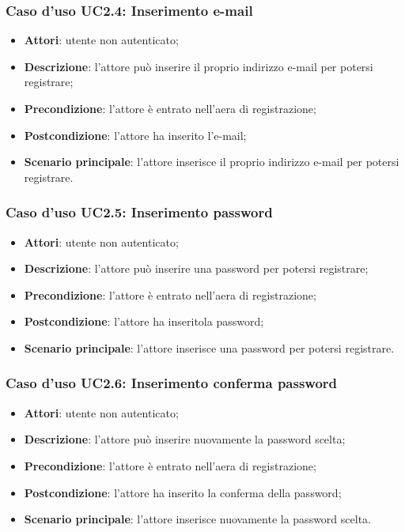 \subsubsection{Caso d'uso UC2.4: Inserimento e-mail}
\begin{itemize}
\item \textbf{Attori}: utente non autenticato;
\item \textbf{Descrizione}: l'attore può inserire il proprio indirizzo e-mail per potersi registrare;
\item \textbf{Precondizione}: l'attore è entrato nell'aera di registrazione;
\item \textbf{Postcondizione}: l'attore ha inserito l'e-mail;
\item \textbf{Scenario principale}: l'attore inserisce il proprio indirizzo e-mail per potersi registrare.
\end{itemize}

\subsubsection{Caso d'uso UC2.5: Inserimento password}
\begin{itemize}
\item \textbf{Attori}: utente non autenticato;
\item \textbf{Descrizione}: l'attore può inserire una password per potersi registrare;
\item \textbf{Precondizione}: l'attore è entrato nell'aera di registrazione;
\item \textbf{Postcondizione}: l'attore ha inseritola password;
\item \textbf{Scenario principale}: l'attore inserisce una password per potersi registrare.
\end{itemize}

\subsubsection{Caso d'uso UC2.6: Inserimento conferma password}
\begin{itemize}
\item \textbf{Attori}: utente non autenticato;
\item \textbf{Descrizione}: l'attore può inserire nuovamente la password scelta;
\item \textbf{Precondizione}: l'attore è entrato nell'aera di registrazione;
\item \textbf{Postcondizione}: l'attore ha inserito la conferma della password;
\item \textbf{Scenario principale}: l'attore inserisce nuovamente la password scelta.
\end{itemize}

